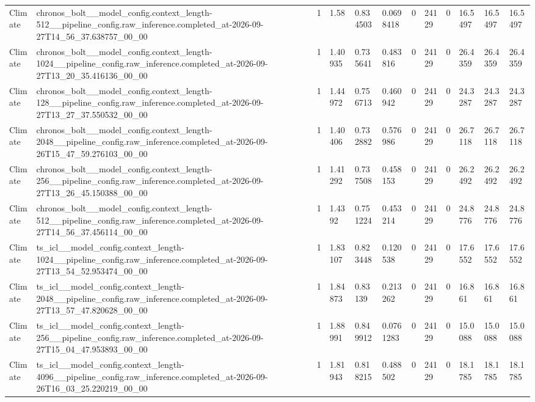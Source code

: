 \begin{tabular}{llllllllllll}
Climate & chronos\_bolt\_\_model\_config.context\_length-512\_\_pipeline\_config.raw\_inference.completed\_at-2026-09-27T14\_56\_37.638757\_00\_00 & 1 & 1.58 & 0.834503 & 0.0698418 & 0 & 24129 & 0 & 16.5497 & 16.5497 & 16.5497 \\
Climate & chronos\_bolt\_\_model\_config.context\_length-1024\_\_pipeline\_config.raw\_inference.completed\_at-2026-09-27T13\_20\_35.416136\_00\_00 & 1 & 1.40935 & 0.735641 & 0.483816 & 0 & 24129 & 0 & 26.4359 & 26.4359 & 26.4359 \\
Climate & chronos\_bolt\_\_model\_config.context\_length-128\_\_pipeline\_config.raw\_inference.completed\_at-2026-09-27T13\_27\_37.550532\_00\_00 & 1 & 1.44972 & 0.756713 & 0.460942 & 0 & 24129 & 0 & 24.3287 & 24.3287 & 24.3287 \\
Climate & chronos\_bolt\_\_model\_config.context\_length-2048\_\_pipeline\_config.raw\_inference.completed\_at-2026-09-26T15\_47\_59.276103\_00\_00 & 1 & 1.40406 & 0.732882 & 0.576986 & 0 & 24129 & 0 & 26.7118 & 26.7118 & 26.7118 \\
Climate & chronos\_bolt\_\_model\_config.context\_length-256\_\_pipeline\_config.raw\_inference.completed\_at-2026-09-27T13\_26\_45.150388\_00\_00 & 1 & 1.41292 & 0.737508 & 0.458153 & 0 & 24129 & 0 & 26.2492 & 26.2492 & 26.2492 \\
Climate & chronos\_bolt\_\_model\_config.context\_length-512\_\_pipeline\_config.raw\_inference.completed\_at-2026-09-27T14\_56\_37.456114\_00\_00 & 1 & 1.4392 & 0.751224 & 0.453214 & 0 & 24129 & 0 & 24.8776 & 24.8776 & 24.8776 \\
Climate & ts\_icl\_\_model\_config.context\_length-1024\_\_pipeline\_config.raw\_inference.completed\_at-2026-09-27T13\_54\_52.953474\_00\_00 & 1 & 1.83107 & 0.823448 & 0.120538 & 0 & 24129 & 0 & 17.6552 & 17.6552 & 17.6552 \\
Climate & ts\_icl\_\_model\_config.context\_length-2048\_\_pipeline\_config.raw\_inference.completed\_at-2026-09-27T13\_57\_47.820628\_00\_00 & 1 & 1.84873 & 0.83139 & 0.213262 & 0 & 24129 & 0 & 16.861 & 16.861 & 16.861 \\
Climate & ts\_icl\_\_model\_config.context\_length-256\_\_pipeline\_config.raw\_inference.completed\_at-2026-09-27T15\_04\_47.953893\_00\_00 & 1 & 1.88991 & 0.849912 & 0.0761283 & 0 & 24129 & 0 & 15.0088 & 15.0088 & 15.0088 \\
Climate & ts\_icl\_\_model\_config.context\_length-4096\_\_pipeline\_config.raw\_inference.completed\_at-2026-09-26T16\_03\_25.220219\_00\_00 & 1 & 1.81943 & 0.818215 & 0.488502 & 0 & 24129 & 0 & 18.1785 & 18.1785 & 18.1785 \\

\end{tabular}
